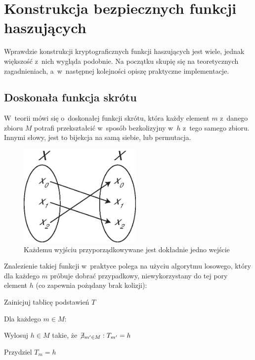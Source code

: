 \section{Konstrukcja bezpiecznych funkcji haszujących}
\label{sec:hash_construction}%
Wprawdzie konstrukcji kryptograficznych funkcji haszujących jest wiele, jednak
większość z~nich wygląda podobnie. Na początku skupię się na teoretycznych
zagadnieniach, a~w~następnej kolejności opiszę praktyczne implementacje.



\subsection{Doskonała funkcja skrótu}
W~teorii mówi się o~doskonałej funkcji skrótu, która każdy element $m$ z~danego
zbioru $M$ potrafi przekształcić w~sposób bezkolizyjny w~$h$ z~tego samego
zbioru. Innymi słowy, jest to bijekcja na samą siebie, lub permutacja.

\begin{figure}[htb!]
    \includegraphics[width=6cm]{img/injection_self.eps}
    \caption{Każdemu wyjściu przyporządkowywane jest dokładnie jedno wejście}
    \label{fig:bijection}
\end{figure}


Znalezienie takiej funkcji w~praktyce polega na użyciu algorytmu losowego,
który dla każdego $m$ próbuje dobrać przypadkowy, niewykorzystany do tej pory
element $h$ (co zapewnia pożądany brak kolizji):

\begin{myenumerate}

    \item Zainicjuj tablicę podstawień $T$

    \item Dla każdego $m \in M$:

    \begin{myenumerate}

        \item Wylosuj $h \in M$ takie, że $\not\!\exists_{m' \in M} : T_{m'} =
        h$

        \item Przydziel $T_m = h$

    \end{myenumerate}

\end{myenumerate}

